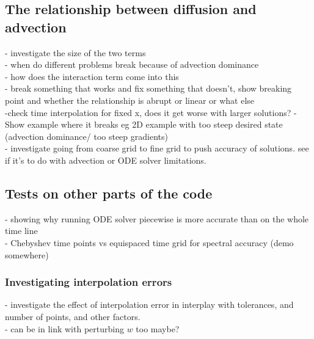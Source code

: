 \documentclass[11pt, a4paper]{article}
\theoremstyle{definition}
\begin{document}
\subsection{The relationship between diffusion and advection}
- investigate the size of the two terms \\
- when do different problems break because of advection dominance\\
- how does the interaction term come into this\\
- break something that works and fix something that doesn't, show breaking point and whether the relationship is abrupt or linear or what else\\
-check time interpolation for fixed x, does it get worse with larger solutions?
- Show example where it breaks eg 2D example with too steep desired state (advection dominance/ too steep gradients)\\
- investigate going from coarse grid to fine grid to push accuracy of solutions. see if it's to do with advection or ODE solver limitations.

\subsection{Tests on other parts of the code}
- showing why running ODE solver piecewise is more accurate than on the whole time line\\
- Chebyshev time points vs equispaced time grid for spectral accuracy (demo somewhere)
\subsubsection{Investigating interpolation errors}
- investigate the effect of interpolation error in interplay with tolerances, and number of points, and other factors.\\
- can be in link with perturbing $w$ too maybe?
\end{document}
